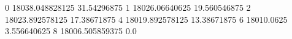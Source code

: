 0 18038.048828125 31.54296875
1 18026.06640625 19.560546875
2 18023.892578125 17.38671875
4 18019.892578125 13.38671875
6 18010.0625 3.556640625
8 18006.505859375 0.0
